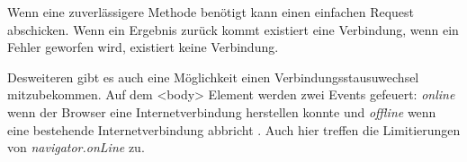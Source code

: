 Wenn eine zuverlässigere Methode benötigt kann einen einfachen Request abschicken. Wenn ein Ergebnis zurück kommt existiert eine Verbindung, wenn ein Fehler geworfen wird, existiert keine Verbindung. 

Desweiteren gibt es auch eine Möglichkeit einen Verbindungsstausuwechsel mitzubekommen. Auf dem <body> Element werden zwei Events gefeuert: \emph{online} wenn der Browser eine Internetverbindung herstellen konnte und \emph{offline} wenn eine bestehende Internetverbindung abbricht \autocite{mdn-online}. Auch hier treffen die Limitierungen von \emph{navigator.onLine} zu.
